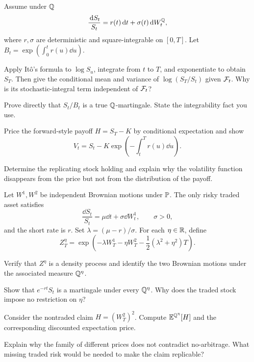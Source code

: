 \begin{exercise}
Assume under \(\mathbb{Q}\)
\[
\frac{\,\mathrm{d} S_t}{S_t}=r(t)\,\mathrm{d} t+\sigma(t)\,\mathrm{d} W_t^{\mathbb{Q}},
\]
where \(r,\sigma\) are deterministic and square-integrable on \([0,T]\).
Let \(B_t=\exp(\int_0^tr(u)\dd u)\).

\begin{exparts}
  \item Apply It\^o's formula to \(\log S_u\), integrate from \(t\) to
  \(T\), and exponentiate to obtain \(S_T\). Then give the conditional
  mean and variance of \(\log(S_T/S_t)\) given \(\mathcal{F}_t\). Why is its
  stochastic-integral term independent of \(\mathcal{F}_t\)?
  \item Prove directly that \(S_t/B_t\) is a true \(\mathbb{Q}\)-martingale.
  State the integrability fact you use.
  \item Price the forward-style payoff \(H=S_T-K\) by conditional
  expectation and show
  \[
  V_t=S_t-K\exp\!\left(-\int_t^T r(u)\dd u\right).
  \]
  \item Determine the replicating stock holding and explain why the
  volatility function disappears from the price but not from the
  distribution of the payoff.
\end{exparts}
\end{exercise}

\begin{exercise}
Let \(W^1,W^2\) be independent Brownian motions under \(\mathbb{P}\). The only
risky traded asset satisfies
\[
\frac{\dd S_t}{S_t}=\mu\dd t+\sigma\dd W_t^1,
\qquad \sigma>0,
\]
and the short rate is \(r\). Set \(\lambda=(\mu-r)/\sigma\). For each
\(\eta\in\mathbb{R}\), define
\[
Z_T^\eta=
\exp\!\left(
-\lambda W_T^1-\eta W_T^2
-\frac12(\lambda^2+\eta^2)T
\right).
\]
\begin{exparts}
  \item Verify that \(Z^\eta\) is a density process and identify the two
  Brownian motions under the associated measure \(\mathbb{Q}^\eta\).
  \item Show that \(e^{-rt}S_t\) is a martingale under every
  \(\mathbb{Q}^\eta\). Why does the traded stock impose no restriction on
  \(\eta\)?
  \item Consider the nontraded claim \(H=(W_T^2)^2\). Compute
  \(\mathbb{E}^{\mathbb{Q}^\eta}[H]\) and the corresponding discounted expectation price.
  \item Explain why the family of different prices does not contradict
  no-arbitrage. What missing traded risk would be needed to make the claim
  replicable?
\end{exparts}
\end{exercise}


